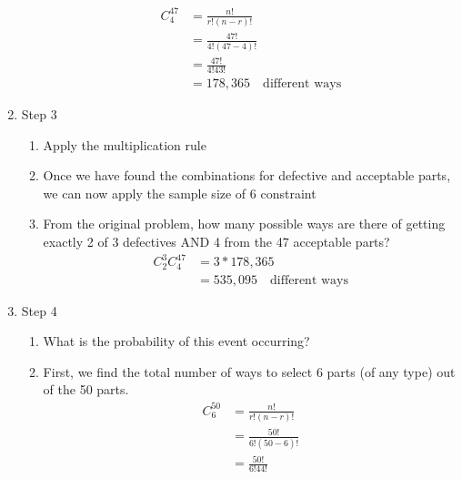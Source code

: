 \documentclass[../INDE315.tex]{subfiles}
\begin{document}
\begin{enumerate}
\begin{enumerate}
\begin{equation*}
                    \begin{aligned}
                        C^{47}_4 &= \frac{n!}{r!(n-r)!} \\
                                    &= \frac{47!}{4!(47-4)!} \\
                                    &= \frac{47!}{4!43!} \\
                                    &= 178,365 \quad \text{different ways}
                    \end{aligned}
                \end{equation*} 
        \end{enumerate}
    \item Step 3
        \begin{enumerate}
            \item Apply the multiplication rule
            \item Once we have found the combinations for defective and acceptable parts, we can now apply the sample size of 6 constraint
            \item From the original problem, how many possible ways are there of getting exactly 2 of 3 defectives AND 4 from the 47 acceptable parts?
                \begin{equation*}
                    \begin{aligned}
                        C^3_2 C^{47}_4 &= 3 * 178,365 \\
                                    &= 535,095 \quad \text{different ways}
                    \end{aligned}
                \end{equation*}     
        \end{enumerate}
    \item Step 4
        \begin{enumerate}
            \item What is the probability of this event occurring?
            \item First, we find the total number of ways to select 6 parts (of any type) out of the 50 parts.
                \begin{equation*}
                    \begin{aligned}
                        C^{50}_6 &= \frac{n!}{r!(n-r)!} \\
                                &= \frac{50!}{6!(50-6)!} \\ 
                                &= \frac{50!}{6!44!} \\

\end{aligned}
\end{equation*}
\end{enumerate}
\end{enumerate}
\end{document}
